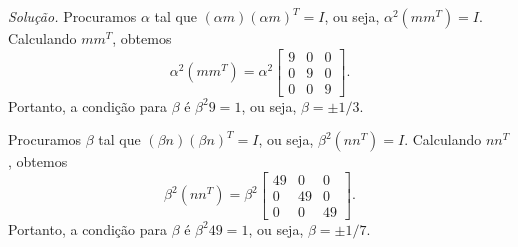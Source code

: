 \documentclass[a4paper,11pt]{article}
\begin{document}
\vspace{\baselineskip}

\emph{Solução.}
Procuramos $\alpha$ tal que $(\alpha m)(\alpha m)^T = I$, ou seja, $\alpha^2 (m m^T) = I$.
Calculando $mm^T$, obtemos
\[
  \alpha^2 (mm^T) = \alpha^2
  \begin{bmatrix}
    9 & 0 & 0 \\
    0 & 9 & 0 \\
    0 & 0 & 9
  \end{bmatrix}.
\]
Portanto, a condição para $\beta$ é $\beta^2 9 = 1$, ou seja, $\beta = \pm 1/3$.

Procuramos $\beta$ tal que $(\beta n)(\beta n)^T = I$, ou seja, $\beta^2 (n n^T) = I$.
Calculando $nn^T$, obtemos
\[
  \beta^2 (nn^T) = \beta^2
  \begin{bmatrix}
    49 & 0 & 0 \\
    0 & 49 & 0 \\
    0 & 0 & 49
  \end{bmatrix}.
\]
Portanto, a condição para $\beta$ é $\beta^2 49 = 1$, ou seja, $\beta = \pm 1/7$.
\end{document}
